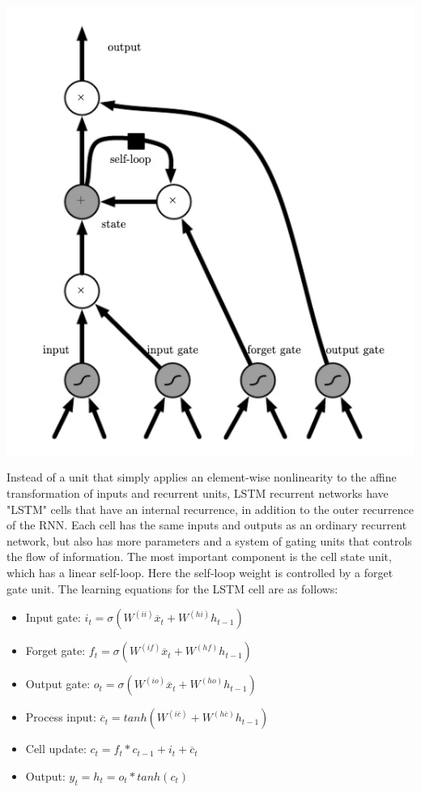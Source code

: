 \documentclass[12pt]{article}
\begin{document}
            \begin{center}  
                \includegraphics[scale=0.3]{LSTM}
            \end{center}

            Instead of a unit that simply applies an element-wise nonlinearity to the affine transformation of inputs and
            recurrent units, LSTM recurrent networks have "LSTM" cells that have an internal recurrence, in addition to
            the outer recurrence of the RNN. Each cell has the same inputs and outputs as an ordinary recurrent network,
            but also has more parameters and a system of gating units that controls the flow of information. The most
            important component is the cell state unit, which has a linear self-loop. Here the self-loop weight is
            controlled by a forget gate unit. The learning equations for the LSTM cell are as follows:

            \begin{itemize}
                \item Input gate: $i_t = \sigma(W^{(ii)} \overline{x}_t + W^{(hi)} h_{t-1})$
                \item Forget gate: $f_t = \sigma(W^{(if)} \overline{x}_t + W^{(hf)} h_{t-1})$
                \item Output gate: $o_t = \sigma(W^{(io)} \overline{x}_t + W^{(ho)} h_{t-1})$
                \item Process input: $\overline{c}_t = tanh(W^{(i\overline{c})} + W^{(h\overline{c})} h_{t-1})$
                \item Cell update: $c_t = f_t * c_{t-1} + i_t + \overline{c}_t$
                \item Output: $y_t = h_t = o_t * tanh(c_t)$
            \end{itemize}
\end{document}
